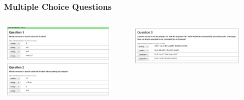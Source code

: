 \begin{frame}
  \frametitle{Multiple Choice Questions}
  \begin{columns}
   \begin{column}{.5\textwidth}
      \includegraphics[width=0.9\textwidth]{images/questions_2}
   \end{column}
   \begin{column}{.5\textwidth}
       \centering
      \includegraphics[width=0.9\textwidth]{images/question_1}
    \end{column}
  \end{columns}
\end{frame}

